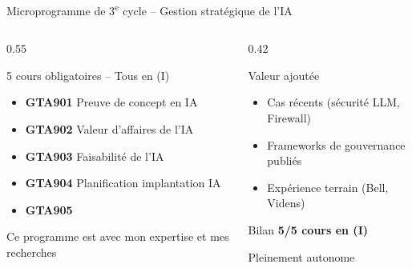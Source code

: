 \documentclass[aspectratio=169,11pt]{beamer}
\begin{document}
\begin{frame}{Microprogramme de 3\textsuperscript{e} cycle -- Gestion stratégique de l'IA}
  \begin{columns}[T]
    \begin{column}{0.55\textwidth}
      \begin{block}{5 cours obligatoires -- Tous en (I)}
        \begin{itemize}
          \item[\textcolor{immediatgreen}{I}] \textbf{GTA901} Preuve de concept en IA
          \item[\textcolor{immediatgreen}{I}] \textbf{GTA902} Valeur d'affaires de l'IA
          \item[\textcolor{immediatgreen}{I}] \textbf{GTA903} Faisabilité de l'IA
          \item[\textcolor{immediatgreen}{I}] \textbf{GTA904} Planification implantation IA
          \item[\textcolor{immediatgreen}{I}] \textbf{GTA905} 
        \end{itemize}
      \end{block}
      
      \vspace{0.3em}
      
      {\small Ce programme est  avec mon expertise et mes recherches}
    \end{column}
    \begin{column}{0.42\textwidth}
      \begin{alertblock}{Valeur ajoutée}
        \begin{itemize}
          \item Cas récents (sécurité LLM, Firewall)
          \item Frameworks de gouvernance publiés
          \item Expérience terrain (Bell, Videns)
        \end{itemize}
      \end{alertblock}
      
      \vspace{0.5em}
      
      \begin{exampleblock}{Bilan}
        \centering
        \textbf{5/5 cours en (I)}
        
        \vspace{0.3em}
        
        {\small Pleinement autonome}
      \end{exampleblock}
    \end{column}
  \end{columns}
\end{frame}
\end{document}
